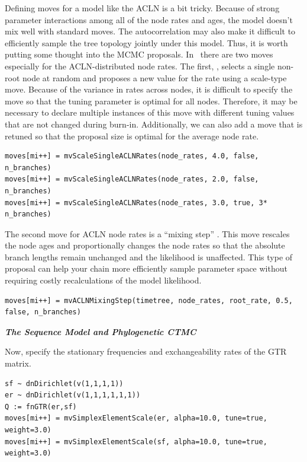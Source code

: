 Defining moves for a model like the ACLN is a bit tricky. Because of strong parameter interactions among all of the node rates and ages, the model doesn't mix well with standard moves. 
The autocorrelation may also make it difficult to efficiently sample the tree topology jointly under this model.
Thus, it is worth putting some thought into the MCMC proposals. 
In \RevBayes~there are two moves especially for the ACLN-distributed node rates.
The first, , selects a single non-root node at random and proposes a new value for the rate using a scale-type move. 
Because of the variance in rates across nodes, it is difficult to specify the move so that the tuning parameter is optimal for all nodes. 
Therefore, it may be necessary to declare multiple instances of this move with different tuning values that are not changed during burn-in.
Additionally, we can also add a move that is retuned so that the proposal size is optimal for the average node rate. 
{\tt \begin{snugshade*}
\begin{lstlisting}
moves[mi++] = mvScaleSingleACLNRates(node_rates, 4.0, false, n_branches)
moves[mi++] = mvScaleSingleACLNRates(node_rates, 2.0, false, n_branches)
moves[mi++] = mvScaleSingleACLNRates(node_rates, 3.0, true, 3* n_branches)
\end{lstlisting}
\end{snugshade*}}

The second move for ACLN node rates is a ``mixing step'' \citep{thorne98,kishino01,thorne02,rannala2003,yang06}.
This move rescales the node ages and proportionally changes the node rates so that the absolute branch lengths remain unchanged and the likelihood is unaffected.
This type of proposal can help your chain more efficiently sample parameter space without requiring costly recalculations of the model likelihood.
{\tt \begin{snugshade*}
\begin{lstlisting}
moves[mi++] = mvACLNMixingStep(timetree, node_rates, root_rate, 0.5, false, n_branches)
\end{lstlisting}
\end{snugshade*}}

\textbf{\textit{The Sequence Model and Phylogenetic CTMC}}

Now, specify the stationary frequencies and exchangeability rates of the GTR matrix.
{\tt \begin{snugshade*}
\begin{lstlisting}
sf ~ dnDirichlet(v(1,1,1,1))
er ~ dnDirichlet(v(1,1,1,1,1,1))
Q := fnGTR(er,sf)
moves[mi++] = mvSimplexElementScale(er, alpha=10.0, tune=true, weight=3.0)
moves[mi++] = mvSimplexElementScale(sf, alpha=10.0, tune=true, weight=3.0)
\end{lstlisting}
\end{snugshade*}}


